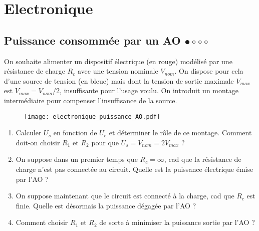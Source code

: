 \chapter{Electronique}

\newpage

\section{Puissance consommée par un AO $\bullet\circ\circ\circ$}
 
On souhaite alimenter un dispositif électrique (en rouge) modélisé par une résistance de charge $R_c$ avec une tension nominale $V_{nom}$. On dispose pour cela d'une source de tension (en bleue) mais dont la tension de sortie maximale $V_{max}$ est $V_{max} = V_{nom}/2$, insuffisante pour l'usage voulu. On introduit un montage intermédiaire pour compenser l'insuffisance de la source. 

\begin{figure}[!h]
\centering
\texttt{[image: electronique\_puissance\_AO.pdf]}
\end{figure}

\begin{enumerate}
	\item Calculer $U_s$ en fonction de $U_e$ et déterminer le rôle de ce montage. Comment doit-on choisir $R_1$ et $R_2$ pour que $U_s = V_{nom}=2V_{max}$ ?
	\item On suppose dans un premier temps que $R_c=\infty$, cad que la résistance de charge n'est pas connectée au circuit. Quelle est la puissance électrique émise par l'AO ?
	\item On suppose maintenant que le circuit est connecté à la charge, cad que $R_c$ est finie. Quelle est désormais la puissance dégagée par l'AO ?
	\item Comment choisir $R_1$ et $R_2$ de sorte à minimiser la puissance sortie par l'AO ?
\end{enumerate}

\newpage

